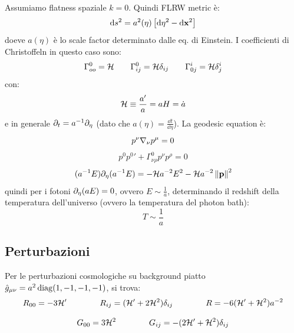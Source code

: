 Assumiamo flatness spaziale $ k = 0 $. %
Quindi FLRW metric è:
\begin{equation}
  \mathrm{d} s^2 = a^2(\eta) \left[ \mathrm{d} \eta^2 - \mathrm{d} \mathbf{x}^2 \right]
\end{equation}
doeve $ a(\eta) $ è lo scale factor determinato dalle eq. di Einstein. I coefficienti di Christoffeln in questo caso sono:
\begin{equation*}
  \Gamma^0_{oo} = \mathcal{H}
  \qquad
  \Gamma^0_{ij} = \mathcal{H} \delta_{ij}
  \qquad
  \Gamma^i_{0j} = \mathcal{H} \delta^i_j
\end{equation*}
con:
\begin{equation*}
  \mathcal{H} \equiv \frac{a'}{a} = a H = \dot{a}
\end{equation*}
e in generale $ \partial_t = a^{-1} \partial_\eta $ (dato che $ a(\eta) = \frac{\dd t}{\dd \eta} $).
La geodesic equation è:
\begin{equation*}
  p^\nu \nabla_\nu p^\mu = 0
\end{equation*}
\begin{equation*}
  p^0 {p^0}' + \Gamma^0_{\nu \rho} p^\nu p^\rho = 0
\end{equation*}
\begin{equation*}
  (a^{-1} E) \partial_\eta (a^{-1} E) = - \mathcal{H} a^{-2} E^2 - \mathcal{H} a^{-2} \left\lVert\mathbf{p}\right\rVert^2
\end{equation*}
quindi per i fotoni $ \partial_\eta(a E) = 0 $, ovvero $ E \sim \frac{1}{a} $, determinando il redshift della temperatura dell'universo (ovvero la temperatura del photon bath):
\begin{equation*}
  T \sim \frac{1}{a}
\end{equation*}

\subsection{Perturbazioni}

Per le perturbazioni cosmologiche su background piatto $ \hat{g}_{\mu \nu} = a^2 \operatorname{diag}(1 , -1 , -1 , -1) $, si trova:
\begin{equation*}
  R_{00} = - 3 \mathcal{H}'
  \qquad \qquad
  R_{ij} = (\mathcal{H}' + 2 \mathcal{H}^2) \delta_{ij}
  \qquad \qquad
  R = - 6 (\mathcal{H}' + \mathcal{H}^2) a^{-2}
\end{equation*}

\begin{equation*}
  G_{00} = 3 \mathcal{H}^2
  \qquad \qquad
  G_{ij} = - (2 \mathcal{H}' + \mathcal{H}^2) \delta_{ij}
\end{equation*}

